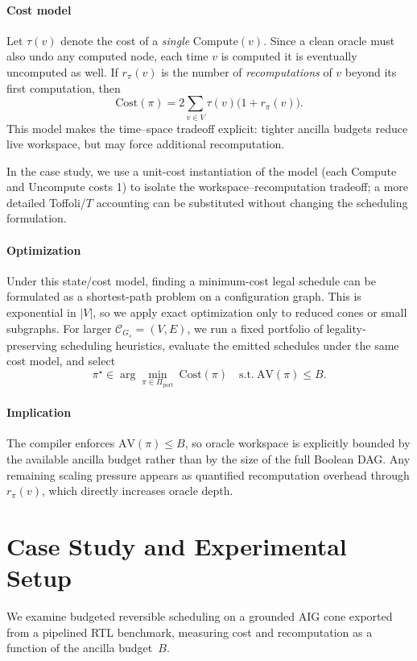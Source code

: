\documentclass[conference]{IEEEtran}
\begin{document}
\paragraph{Cost model}
Let $\tau(v)$ denote the cost of a \emph{single} $\mathrm{Compute}(v)$.
Since a clean oracle must also undo any computed node, each time $v$ is computed it is eventually uncomputed as well.
If $r_\pi(v)$ is the number of \emph{recomputations} of $v$ beyond its first computation, then
\[
\mathrm{Cost}(\pi)=2\sum_{v\in V}\tau(v)\big(1+r_\pi(v)\big).
\]
This model makes the time--space tradeoff explicit: tighter ancilla budgets reduce live workspace, but may force additional recomputation.

In the case study, we use a unit-cost instantiation of the model (each \(\mathrm{Compute}\) and \(\mathrm{Uncompute}\) costs 1) to isolate the workspace--recomputation tradeoff; a more detailed Toffoli/$T$ accounting can be substituted without changing the scheduling formulation.

\paragraph{Optimization}
Under this state/cost model, finding a minimum-cost legal schedule can be formulated as a shortest-path problem on a configuration graph.
This is exponential in $|V|$, so we apply exact optimization only to reduced cones or small subgraphs.
For larger $\mathcal{C}_{G_s}=(V,E)$, we run a fixed portfolio of legality-preserving scheduling heuristics, evaluate the emitted schedules under the same cost model, and select
\[
\pi^\star \in \arg\min_{\pi\in\Pi_{\text{port}}}\ \mathrm{Cost}(\pi)
\quad \text{s.t.}\ \mathrm{AV}(\pi)\le B.
\]

\paragraph{Implication}
The compiler enforces $\mathrm{AV}(\pi)\le B$, so oracle workspace is explicitly bounded by the available ancilla budget rather than by the size of the full Boolean DAG.
Any remaining scaling pressure appears as quantified recomputation overhead through $r_\pi(v)$, which directly increases oracle depth.

\section{Case Study and Experimental Setup}

We examine budgeted reversible scheduling on a grounded AIG cone exported from a pipelined RTL benchmark, measuring cost and recomputation as a function of the ancilla budget~$B$.
\end{document}
